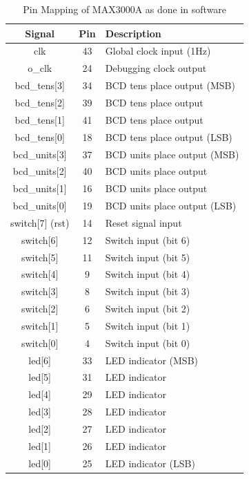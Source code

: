\documentclass[10pt,a4paper,twocolumn,twoside]{tau-class/tau}
\begin{document}
    \begin{table}[h!]
        \centering
        \begin{tabular}{|c|c|l|}
            \hline
            \textbf{Signal} & \textbf{Pin} & \textbf{Description} \\
            \hline
            clk & 43 & Global clock input (1Hz) \\
            o\_clk & 24 & Debugging clock output \\
            \hline
            bcd\_tens[3] & 34 & BCD tens place output (MSB) \\
            bcd\_tens[2] & 39 & BCD tens place output \\
            bcd\_tens[1] & 41 & BCD tens place output \\
            bcd\_tens[0] & 18 & BCD tens place output (LSB) \\
            bcd\_units[3] & 37 & BCD units place output (MSB) \\
            bcd\_units[2] & 40 & BCD units place output \\
            bcd\_units[1] & 16 & BCD units place output \\
            bcd\_units[0] & 19 & BCD units place output (LSB) \\
            \hline
            switch[7] (rst) & 14 & Reset signal input \\
            switch[6] & 12 & Switch input (bit 6) \\
            switch[5] & 11 & Switch input (bit 5) \\
            switch[4] & 9  & Switch input (bit 4) \\
            switch[3] & 8  & Switch input (bit 3) \\
            switch[2] & 6  & Switch input (bit 2) \\
            switch[1] & 5  & Switch input (bit 1) \\
            switch[0] & 4  & Switch input (bit 0) \\
            \hline
            led[6] & 33 & LED indicator (MSB) \\
            led[5] & 31 & LED indicator \\
            led[4] & 29 & LED indicator \\
            led[3] & 28 & LED indicator \\
            led[2] & 27 & LED indicator \\
            led[1] & 26 & LED indicator \\
            led[0] & 25 & LED indicator (LSB) \\
            \hline
        \end{tabular}
        \caption{Pin Mapping of MAX3000A as done in software}
        \label{tab:pinmapping}
    \end{table}
    
\end{document}
